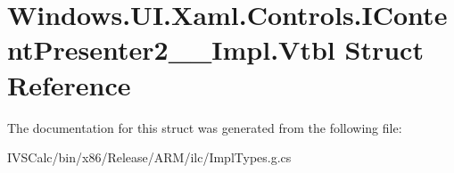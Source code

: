 \hypertarget{struct_windows_1_1_u_i_1_1_xaml_1_1_controls_1_1_i_content_presenter2_____impl_1_1_vtbl}{}\section{Windows.\+U\+I.\+Xaml.\+Controls.\+I\+Content\+Presenter2\+\_\+\+\_\+\+Impl.\+Vtbl Struct Reference}
\label{struct_windows_1_1_u_i_1_1_xaml_1_1_controls_1_1_i_content_presenter2_____impl_1_1_vtbl}


The documentation for this struct was generated from the following file\+:\begin{DoxyCompactItemize}
\item 
I\+V\+S\+Calc/bin/x86/\+Release/\+A\+R\+M/ilc/Impl\+Types.\+g.\+cs\end{DoxyCompactItemize}

